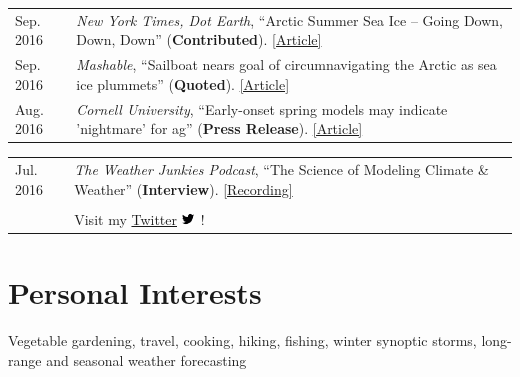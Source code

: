 \documentclass[margin,line,palatino,courier,10pt]{res}
\begin{document}
\begin{resume}
\begin{tabular}{@{}p{0.9in}p{4in}}
Sep. 2016 & \textit{New York Times, Dot Earth}, ``Arctic Summer Sea Ice -- Going Down, Down, Down'' (\textbf{Contributed}). \href{http://dotearth.blogs.nytimes.com/2016/09/16/arctic-summer-sea-ice-going-down-down-down/?module=BlogPost-ReadMore&version=Blog\%20Main&action=Click&contentCollection=arctic&pgtype=Blogs&region=Body&_r=1#more-58318}{[Article]}\\
Sep. 2016 & \textit{Mashable}, ``Sailboat nears goal of circumnavigating the Arctic as sea ice plummets'' (\textbf{Quoted}). \href{http://mashable.com/2016/09/01/sailboat-arctic-ice-melt-open-water/#s7nzft8m6sqB}{[Article]}\\
Aug. 2016 & \textit{Cornell University}, ``Early-onset spring models may indicate 'nightmare' for ag'' (\textbf{Press Release}). \href{http://www.news.cornell.edu/stories/2016/08/early-onset-spring-models-may-indicate-nightmare-ag}{[Article]}\\
\end{tabular}
\begin{tabular}{@{}p{0.9in}p{4in}}
Jul. 2016 & \textit{The Weather Junkies Podcast}, ``The Science of Modeling Climate \& Weather'' (\textbf{Interview}). \href{https://www.youtube.com/watch?v=vgT5P9zC91U}{[Recording]}\\\\

& Visit my \href{https://twitter.com/ZLabe}{Twitter} \includegraphics[height=9pt]{twitter.png}\ !\\
\end{tabular}

\vspace{-0.1in}
\noindent\textcolor{Cerulean}{\makebox[\linewidth][r]{\rule{\textwidth}{5pt}}}
\vspace{-0.3in}
\section{\sc \textcolor{Cerulean}{\large{\textbf{Personal Interests}}}}
Vegetable gardening, travel, cooking, hiking, fishing, winter synoptic storms, long-range and seasonal weather forecasting

\end{resume}
\end{document}

